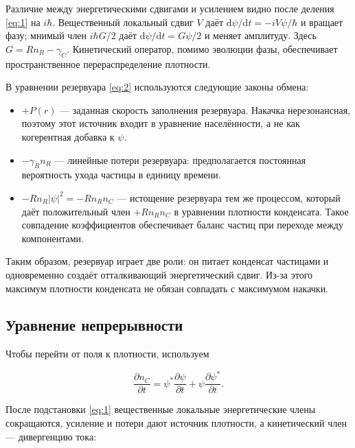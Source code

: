 \documentclass[12pt,a4paper]{article}
\begin{document}
Различие между энергетическими сдвигами и усилением видно после деления \eqref{eq:1} на $i \hbar$. Вещественный локальный сдвиг $V$ даёт $\mathrm d \psi/\mathrm dt=-i V \psi/\hbar$ и вращает фазу; мнимый член $i \hbar G/2$ даёт $\mathrm d \psi/\mathrm dt=G \psi/2$ и меняет амплитуду. Здесь $G=R n_{R}-\gamma_{C}$. Кинетический оператор, помимо эволюции фазы, обеспечивает пространственное перераспределение плотности.

В уравнении резервуара \eqref{eq:2} используются следующие законы обмена:

\begin{itemize}\raggedright\setlength{\itemsep}{3pt}\setlength{\parsep}{0pt}

\item $+P(r)$ --- заданная скорость заполнения резервуара. Накачка нерезонансная, поэтому этот источник входит в уравнение населённости, а не как когерентная добавка к $\psi$.

\item $-\gamma_{R} n_{R}$ --- линейные потери резервуара: предполагается постоянная вероятность ухода частицы в единицу времени.

\item $-R n_{R}|\psi|^{2}=-R n_{R} n_{C}$ --- истощение резервуара тем же процессом, который даёт положительный член $+R n_{R} n_{C}$ в уравнении плотности конденсата. Такое совпадение коэффициентов обеспечивает баланс частиц при переходе между компонентами.

\end{itemize}

Таким образом, резервуар играет две роли: он питает конденсат частицами и одновременно создаёт отталкивающий энергетический сдвиг. Из-за этого максимум плотности конденсата не обязан совпадать с максимумом накачки.

\subsection{Уравнение непрерывности}\label{sec:2.3}

Чтобы перейти от поля к плотности, используем

\[
\frac{\partial n_C}{\partial t}=\psi^*\frac{\partial\psi}{\partial t}+\psi\frac{\partial\psi^*}{\partial t}.
\]

После подстановки \eqref{eq:1} вещественные локальные энергетические члены сокращаются, усиление и потери дают источник плотности, а кинетический член --- дивергенцию тока:
\end{document}
